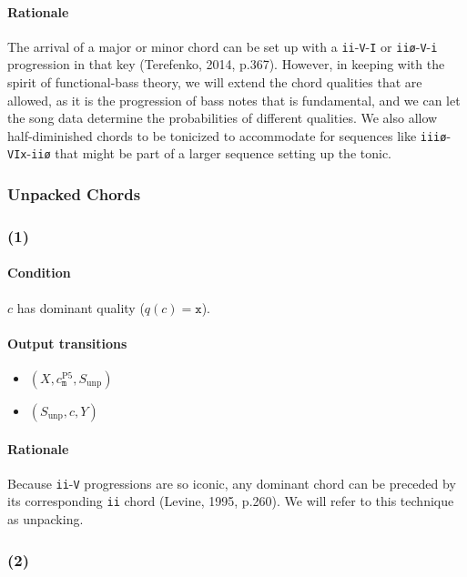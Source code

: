 \documentclass[]{article}
\begin{document}
\paragraph{Rationale} The arrival of a major or minor chord can be set up with a \texttt{ii}-\texttt{V}-\texttt{I} or \texttt{ii\o}-\texttt{V}-\texttt{i} progression in that key (Terefenko, 2014, p.367).  However, in keeping with the spirit of functional-bass theory, we will extend the chord qualities that are allowed, as it is the progression of bass notes that is fundamental, and we can let the song data determine the probabilities of different qualities.  We also allow half-diminished chords to be tonicized to accommodate for sequences like \texttt{iii\o}-\texttt{VIx}-\texttt{ii\o} that might be part of a larger sequence setting up the tonic.

\subsubsection{Unpacked Chords}
\label{sec:unpacked_chords}
\subsubsection*{(1)}
\paragraph{Condition} $c$ has dominant quality ($q(c) = \texttt{x}$).

\paragraph{Output transitions}
\begin{itemize}
	\item $(X, c_\texttt{m}^\textrm{P5}, S_\textrm{unp})$
	\item $(S_\textrm{unp}, c, Y)$
\end{itemize}

\paragraph{Rationale} Because \texttt{ii}-\texttt{V} progressions are so iconic, any dominant chord can be preceded by its corresponding \texttt{ii} chord (Levine, 1995, p.260).  We will refer to this technique as unpacking.

\subsubsection*{(2)}
\end{document}
